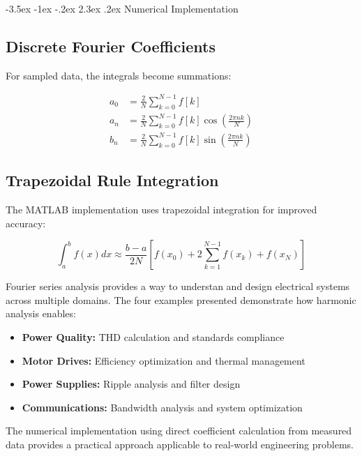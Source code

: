 \documentclass[nohyper,nobib,xcolor=dvipsnames,svgnames,x11names]{tufte-book}
\makeatletter
\renewcommand\section{\@startsection{section}{1}{\z@}%
                     {-3.5ex \@plus -1ex \@minus -.2ex}%
                     {2.3ex \@plus.2ex}%
                     {\normalfont\Large\bfseries\color{darkorange}}}
\makeatother
\begin{document}
\section{Numerical Implementation}

\subsection{Discrete Fourier Coefficients}

For sampled data, the integrals become summations:

\begin{align}
a_0 &= \frac{2}{N} \sum_{k=0}^{N-1} f[k] \\
a_n &= \frac{2}{N} \sum_{k=0}^{N-1} f[k] \cos\left(\frac{2\pi n k}{N}\right) \\
b_n &= \frac{2}{N} \sum_{k=0}^{N-1} f[k] \sin\left(\frac{2\pi n k}{N}\right)
\end{align}

\subsection{Trapezoidal Rule Integration}

The MATLAB implementation uses trapezoidal integration for improved accuracy:

\begin{equation}
\int_{a}^{b} f(x) dx \approx \frac{b-a}{2N} \left[f(x_0) + 2\sum_{k=1}^{N-1} f(x_k) + f(x_N)\right]
\end{equation}



Fourier series analysis provides a way to understan and design electrical systems across multiple domains. The four examples presented demonstrate how harmonic analysis enables:

\begin{itemize}
\item \textbf{Power Quality:} THD calculation and standards compliance
\item \textbf{Motor Drives:} Efficiency optimization and thermal management
\item \textbf{Power Supplies:} Ripple analysis and filter design
\item \textbf{Communications:} Bandwidth analysis and system optimization
\end{itemize}

The numerical implementation using direct coefficient calculation from measured data provides a practical approach applicable to real-world engineering problems.
\end{document}

